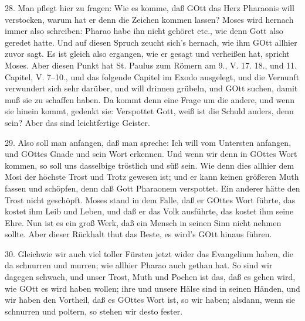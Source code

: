 28. Man pflegt hier zu fragen: Wie es komme, daß GOtt das Herz Pharaonis will verstocken, warum hat er denn die Zeichen kommen lassen? Moses wird hernach immer also schreiben: Pharao habe ihn nicht gehöret etc., wie denn
Gott also geredet hatte. Und auf diesen Spruch zeucht sich's hernach, wie ihm GOtt allhier zuvor sagt. Es ist gleich also ergangen, wie er gesagt und verheißen hat, spricht Moses. Aber diesen Punkt hat St. Paulus zum Römern am 9., V. 17. 18., und 11. Capitel, V. 7–10., und das folgende Capitel im Exodo ausgelegt, und die Vernunft verwundert sich sehr darüber, und will drinnen grübeln, und GOtt suchen, damit muß sie zu schaffen haben. Da kommt denn eine Frage um die andere, und wenn sie hinein kommt, gedenkt sie: Verspottet Gott, weiß ist die Schuld anders, denn sein? Aber das sind leichtfertige Geister.

29. Also soll man anfangen, daß man spreche: Ich will vom Untersten anfangen, und GOttes Gnade und sein Wort erkennen. Und wenn wir denn in GOttes Wort kommen, so soll uns dasselbige tröstlich und süß sein. Wie denn dies allhier dem Mosi der höchste Trost und Trotz gewesen ist; und er kann keinen größeren Muth fassen und schöpfen, denn daß Gott Pharaonem verspottet. Ein anderer hätte den Trost nicht geschöpft. Moses stand in dem Falle, daß er GOttes Wort führte, das kostet ihm Leib und Leben, und daß er das Volk ausführte, das kostet ihm seine Ehre. Nun ist es ein groß Werk, daß ein Mensch in seinen Sinn nicht nehmen sollte. Aber dieser Rückhalt thut das Beste, es wird's GOtt hinaus führen.

30. Gleichwie wir auch viel toller Fürsten jetzt wider das Evangelium haben, die da schnurren und murren; wie allhier Pharao auch gethan hat. So sind wir dagegen schwach, und unser Trost, Muth und Pochen ist das, daß es gehen wird, wie GOtt es wird haben wollen; ihre und unsere Hälse sind in seinen Händen, und wir haben den Vortheil, daß es GOttes Wort ist, so wir haben; alsdann, wenn sie schnurren und poltern, so stehen wir desto fester.

